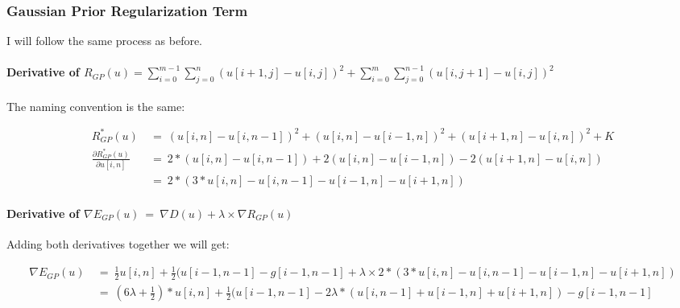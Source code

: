 \documentclass{report}
\begin{document}
			\subsubsection{Gaussian Prior Regularization Term}
			\startsubsection
				I will follow the same process as before.
				\vspace{-0.4cm} \paragraph{Derivative of $R_{GP}(u) = \sum_{i=0}^{m-1} \sum_{j=0}^{n} ( u[i+1,j] - u[i,j] )^2 + \sum_{i=0}^{m} \sum_{j=0}^{n-1} ( u[i,j+1] - u[i,j] )^2$}
				\startsubsection
					\vspace{0.2cm} The naming convention is the same:
				\closesection
				\begin{adjustwidth}{-4em}{}
					\vspace{-0.5cm}
					\begin{align*}
						R_{GP}^*(u) \ & = \ (u[i,n] - u[i,n-1])^2 + (u[i,n] - u[i-1,n])^2 + (u[i+1,n] - u[i,n])^2 + K \\
						\frac{\partial R_{GP}^*(u)}{\partial u[i,n]} \ & = \ 2 * (u[i,n] - u[i,n-1]) + 2 (u[i,n] - u[i-1,n]) - 2 (u[i+1,n] - u[i,n]) \\
						& = \ 2 * (3 * u[i,n] - u[i,n-1] - u[i-1,n] - u[i+1,n])
					\end{align*}
				\end{adjustwidth}
				\vspace{-0.4cm} \paragraph{Derivative of $\nabla E_{GP}(u) \ = \ \nabla D(u) + \lambda \times \nabla R_{GP}(u)$}
				\startsubsection
					Adding both derivatives together we will get:
				\closesection
				\begin{adjustwidth}{-7em}{}
					\vspace{-0.6cm}
					\begin{align*}
						\nabla E_{GP}(u) \ & = \ \frac{1}{2} u[i,n]  + \frac{1}{2} (u[i-1,n-1] - g[i-1,n-1] + \lambda \times 2 * (3 * u[i,n] - u[i,n-1] - u[i-1,n] - u[i+1,n]) \\
						& = \ (6 \lambda + \frac{1}{2}) * u[i,n]  + \frac{1}{2} (u[i-1,n-1] - 2\lambda*(u[i,n-1] + u[i-1,n] + u[i+1,n]) - g[i-1,n-1]
					\end{align*}
				\end{adjustwidth}
			\closesection
\end{document}
